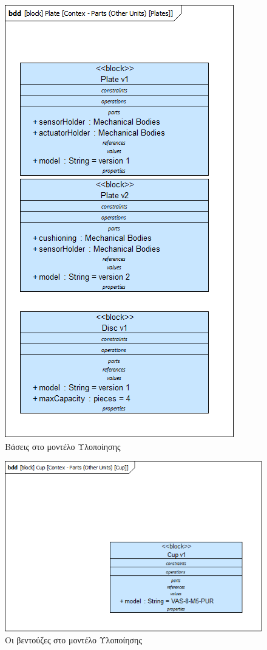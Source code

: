 \documentclass[a4paper,12pt,twoside]{report}
\begin{document}
{\begin{appendices}
				\begin{figure}[hp]
					\centering
					\includegraphics[scale=0.50]{DesignModel_Contex-Parts(OtherUnits)[Plates].png}
					\caption{Βάσεις στο μοντέλο Υλοποίησης}
					\label{φωτ:Βάσεις στο μοντέλο Υλοποίησης}
				\end{figure}
				
				\begin{figure}[hp]
					\centering
					\includegraphics[scale=0.50]{DesignModel_Contex-Parts(OtherUnits)[Cup].png}
					\caption{Οι βεντούζες στο μοντέλο Υλοποίησης}
					\label{φωτ:Οι βεντούζες στο μοντέλο Υλοποίησης}
				\end{figure}
				

\end{appendices}}
\end{document}
